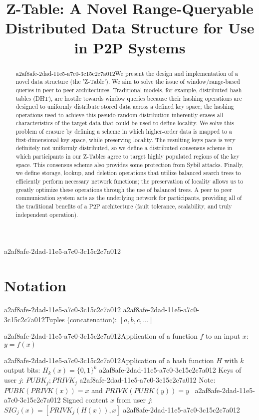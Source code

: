 \documentclass[12pt]{article}
\title{Z-Table: A Novel Range-Queryable Distributed Data Structure for Use in P2P Systems}
\begin{document}
\maketitle

a2af8afe-2dad-11e5-a7c0-3c15c2c7a012\begin{abstract}
a2af8afe-2dad-11e5-a7c0-3c15c2c7a012We present the design and implementation of a novel data structure (the 'Z-Table'). We aim to solve the issue of window/range-based queries in peer to peer architectures. Traditional models, for example,  distributed hash tables (DHT), are hostile towards window queries because their hashing operations are designed to uniformly distribute stored data across a defined key space; the hashing operations used to achieve this pseudo-random distribution inherently erases all characteristics of the target data that could be used to define locality. We solve this problem of erasure by defining a scheme in which higher-order data is mapped to a first-dimensional key space, while preserving locality. The resulting keys pace is very definitely not uniformly distributed, so we define a distributed consensus scheme in which participants in our Z-Tables agree to target highly populated regions of the key space. This consensus scheme also provides some protection from Sybil attacks. Finally, we define storage, lookup, and deletion operations that utilize balanced search trees to efficiently perform necessary network functions; the preservation of locality allows us to greatly optimize these operations through the use of balanced trees. A peer to peer communication system acts as the underlying network for participants, providing all of the traditional benefits of a P2P architecture (fault tolerance, scalability, and truly independent operation).
\end{abstract}

\section{Notation}
a2af8afe-2dad-11e5-a7c0-3c15c2c7a012
a2af8afe-2dad-11e5-a7c0-3c15c2c7a012Tuples (concatenation): $[a,b,c,...]$

a2af8afe-2dad-11e5-a7c0-3c15c2c7a012Application of a function $f$ to an input $x$: $y=f(x)$

a2af8afe-2dad-11e5-a7c0-3c15c2c7a012Application of a hash function $H$ with $k$ output bits: $H_{k}(x) = \{0,1\}^k$
a2af8afe-2dad-11e5-a7c0-3c15c2c7a012
Keys of user $j$: $ PUBK_j; PRIVK_j $
a2af8afe-2dad-11e5-a7c0-3c15c2c7a012
Note: $PUBK(PRIVK(x)) = x$ and $PRIVK(PUBK(y)) = y$~
a2af8afe-2dad-11e5-a7c0-3c15c2c7a012
Signed content $x$ from user $j$: $SIG_j(x) = \left[ PRIVK_j( H(x) ), x \right]$
a2af8afe-2dad-11e5-a7c0-3c15c2c7a012
\end{document}
